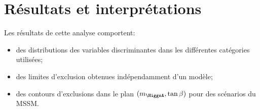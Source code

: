 \section{Résultats et interprétations}\label{chapter-HTT_analysis-section-results}
Les résultats de cette analyse comportent:
\begin{itemize}
\item des distributions des variables discriminantes dans les différentes catégories utilisées;
\item des limites d'exclusion obtenues indépendamment d'un modèle;
\item des contours d'exclusions dans le plan $(m_{\HiggsA},\tan\beta)$ pour des scénarios du MSSM.
\end{itemize}

%
%
%


%
%
%
%
%
%
%
